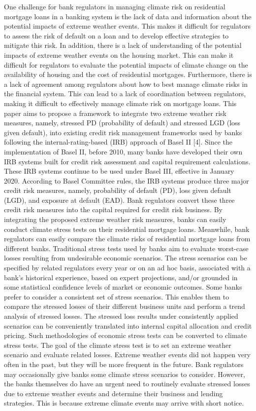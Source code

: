 One challenge for bank regulators in managing climate risk on residential mortgage loans in a banking system is the lack of data and information about the potential impacts of extreme weather events. This makes it difficult for regulators to assess the risk of default on a loan and to develop effective strategies to mitigate this risk. In addition, there is a lack of understanding of the potential impacts of extreme weather events on the housing market. This can make it difficult for regulators to evaluate the potential impacts of climate change on the availability of housing and the cost of residential mortgages. Furthermore, there is a lack of agreement among regulators about how to best manage climate risks in the financial system. This can lead to a lack of coordination between regulators, making it difficult to effectively manage climate risk on mortgage loans.
This paper aims to propose a framework to integrate two extreme weather risk measures, namely, stressed PD (probability of default) and stressed LGD (loss given default), into existing credit risk management frameworks used by banks following the internal-rating-based (IRB) approach of Basel II [4]. Since the implementation of Basel II, before 2010, many banks have developed their own IRB systems built for credit risk assessment and capital requirement calculations. These IRB systems continue to be used under Basel III, effective in January 2020. According to Basel Committee rules, the IRB systems produce three major credit risk measures, namely, probability of default (PD), loss given default (LGD), and exposure at default (EAD). Bank regulators convert these three credit risk measures into the capital required for credit risk business. By integrating the proposed extreme weather risk measures, banks can easily conduct climate stress tests on their residential mortgage loans. Meanwhile, bank regulators can easily compare the climate risks of residential mortgage loans from different banks.
Traditional stress tests used by banks aim to evaluate worst-case losses resulting from undesirable economic scenarios. The stress scenarios can be specified by related regulators every year or on an ad hoc basis, associated with a bank’s historical experience, based on expert projections, and/or grounded in some statistical confidence levels of market or economic outcomes. Some banks prefer to consider a consistent set of stress scenarios. This enables them to compare the stressed losses of their different business units and perform a trend analysis of stressed losses. The stressed loss results under consistently applied scenarios can be conveniently translated into internal capital allocation and credit pricing. Such methodologies of economic stress tests can be converted to climate stress tests. The goal of the climate stress test is to set an extreme weather scenario and evaluate related losses. Extreme weather events did not happen very often in the past, but they will be more frequent in the future. Bank regulators may occasionally give banks some climate stress scenarios to consider. However, the banks themselves do have an urgent need to routinely evaluate stressed losses due to extreme weather events and determine their business and lending strategies. This is because extreme climate events may arrive with short notice.
